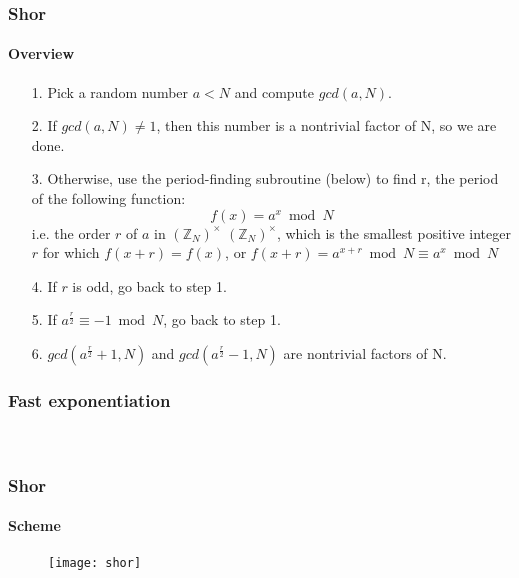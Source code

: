 \begin{frame}
	\frametitle{Shor}
		\framesubtitle{Overview}
		\begin{enumerate}
		\item[1.]{Pick a random number $a < N$ and compute $gcd(a, N)$.}\\
		\item[2.]{If $gcd(a, N) \neq 1$, then this number is a nontrivial factor of N, so we are done.}\\
		\item[3.]{Otherwise, use the period-finding subroutine (below) to find r, the period of the following function:}
		$$f(x)=a^{x}{\bmod {N}}$$
i.e. the order $r$ of $a$ in $(\mathbb {Z} _{N})^{\times }$ $(\mathbb {Z} _{N})^{\times }$, which is the smallest positive integer $r$ for which $f(x+r)=f(x)$, or $f(x+r)=a^{x+r}{\bmod {N}}\equiv a^{x}{\bmod {N}}$ 
		\item[4.]{If $r$ is odd, go back to step 1.}\\
		\item[5.]{If $a^{ \frac{r}{2}} \equiv -{1 \bmod{N}}$, go back to step 1.}\\
		\item[6.]{$gcd(a^{ \frac{r}{2}} + 1, N)$ and $gcd(a^{ \frac{r}{2}} - 1, N)$ are nontrivial factors of N.}\\
		\end{enumerate}
\end{frame}

\begin{frame}
	\frametitle{Fast exponentiation}
		\framesubtitle{}

		{\normalsize
		\\
		}
		

\end{frame}

\begin{frame}
	\frametitle{Shor}
		\framesubtitle{Scheme}
	\vspace{0.5cm}
		\begin{figure}
		\centering
			\texttt{[image: shor]}
			\label{fig:shor shor}
		\end{figure}

\end{frame}


